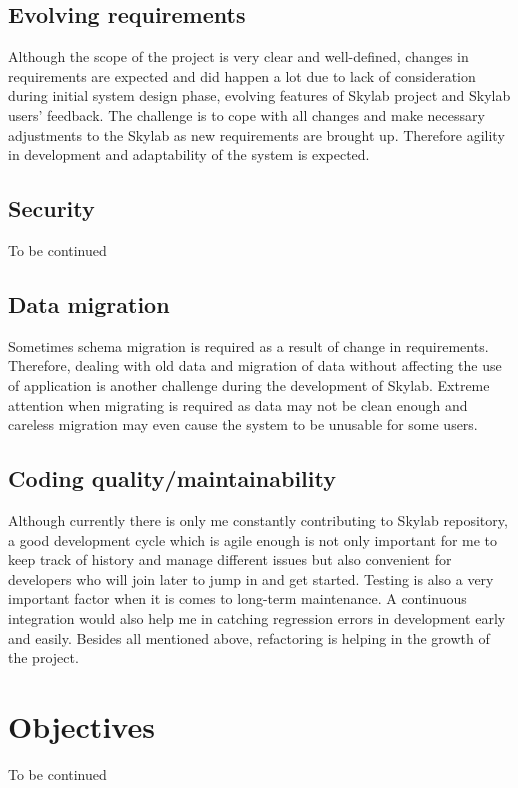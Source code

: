 \subsection{Evolving requirements}
Although the scope of the project is very clear and well-defined, changes in requirements are expected and did happen a lot due to lack of consideration during initial system design phase, evolving features of Skylab project and Skylab users' feedback. The challenge is to cope with all changes and make necessary adjustments to the Skylab as new requirements are brought up. Therefore agility in development and adaptability of the system is expected.
\subsection{Security}
To be continued
\subsection{Data migration}
Sometimes schema migration is required as a result of change in requirements. Therefore, dealing with old data and migration of data without affecting the use of application is another challenge during the development of Skylab. Extreme attention when migrating is required as data may not be clean enough and careless migration may even cause the system to be unusable for some users.
\subsection{Coding quality/maintainability}
Although currently there is only me constantly contributing to Skylab repository, a good development cycle which is agile enough is not only important for me to keep track of history and manage different issues but also convenient for developers who will join later to jump in and get started. Testing is also a very important factor when it is comes to long-term maintenance. A continuous integration would also help me in catching regression errors in development early and easily. Besides all mentioned above, refactoring is helping in the growth of the project.


\section{Objectives}

To be continued

